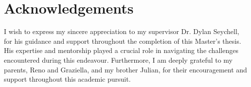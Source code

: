 \chapter*{Acknowledgements}

I wish to express my sincere appreciation to my supervisor Dr. Dylan Seychell, for his guidance and support throughout the completion of this Master's thesis. His expertise and mentorship played a crucial role in navigating the challenges encountered during this endeavour. Furthermore, I am deeply grateful to my parents, Reno and Graziella, and my brother Julian, for their encouragement and support throughout this academic pursuit.